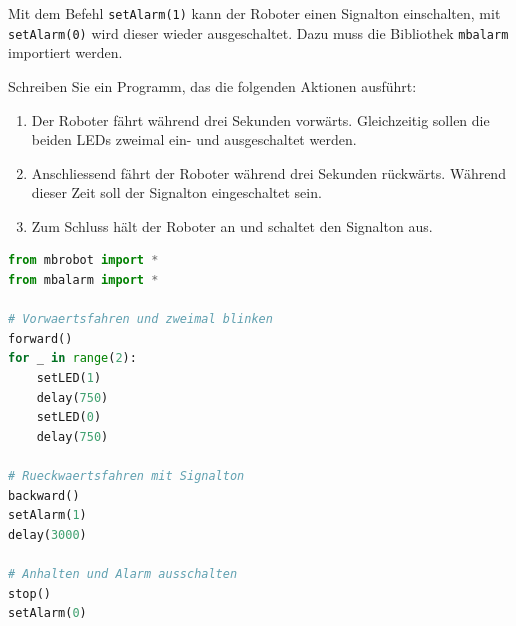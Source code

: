 \begin{myexercise}

    Mit dem Befehl \texttt{setAlarm(1)} kann der Roboter
    einen Signalton einschalten, mit \texttt{setAlarm(0)}
    wird dieser wieder ausgeschaltet. Dazu muss die
    Bibliothek \texttt{mbalarm} importiert werden.

    Schreiben Sie ein Programm, das die folgenden
    Aktionen ausführt:

    \begin{enumerate}
        \item Der Roboter fährt während drei Sekunden
              vorwärts. Gleichzeitig sollen die beiden
              LEDs zweimal ein- und ausgeschaltet werden.

        \item Anschliessend fährt der Roboter während
              drei Sekunden rückwärts. Während dieser
              Zeit soll der Signalton eingeschaltet sein.

        \item Zum Schluss hält der Roboter an und
              schaltet den Signalton aus.
    \end{enumerate}

    \begin{myanswer}
        \begin{lstlisting}[language=Python]
from mbrobot import *
from mbalarm import *

# Vorwaertsfahren und zweimal blinken
forward()
for _ in range(2):
    setLED(1)
    delay(750)
    setLED(0)
    delay(750)

# Rueckwaertsfahren mit Signalton
backward()
setAlarm(1)
delay(3000)

# Anhalten und Alarm ausschalten
stop()
setAlarm(0)
        \end{lstlisting}
    \end{myanswer}
\end{myexercise}


